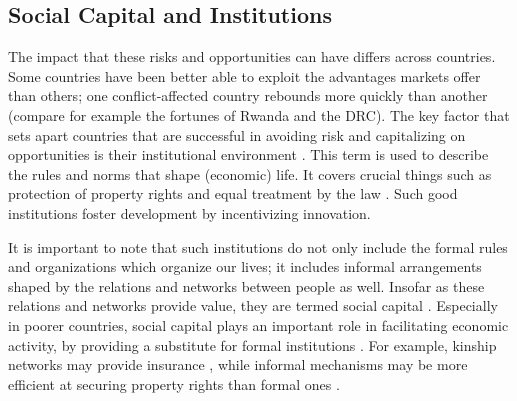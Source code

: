 

\subsection{Social Capital and Institutions}
The impact that these risks and opportunities can have differs across countries. Some countries have been better able to exploit the advantages markets offer than others; one conflict-affected country rebounds more quickly than another (compare for example the fortunes of Rwanda and the DRC). The key factor that sets apart countries that are successful in avoiding risk and capitalizing on opportunities is their institutional environment \citep{Rodrik2004,Acemoglu2000}. This term is used to describe the rules and norms that shape (economic) life. It covers crucial things such as protection of property rights and equal treatment by the law \citep{Acemoglu2005}. Such good institutions  foster development by incentivizing innovation. %

It is important to note that such institutions do not only include the formal rules and organizations which organize our lives; it includes informal arrangements shaped by the relations and networks between people as well. Insofar as these relations and networks provide value, they are termed social capital \citep[see for a more detailed discussion of the definition of the term][]{Putnam2001}. Especially in poorer countries, social capital plays an important role in facilitating economic activity, by providing a substitute for formal institutions \citep{Knack1997}. For example, kinship networks may provide insurance \citep{DiFalco2011}, while informal mechanisms may be more efficient at securing property rights than formal ones \citep{Platteau1996}. 

